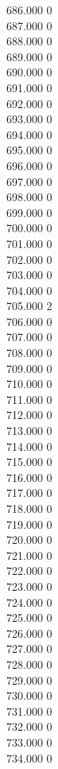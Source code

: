 { 686.000	0 \\
 687.000	0 \\
 688.000	0 \\
 689.000	0 \\
 690.000	0 \\
 691.000	0 \\
 692.000	0 \\
 693.000	0 \\
 694.000	0 \\
 695.000	0 \\
 696.000	0 \\
 697.000	0 \\
 698.000	0 \\
 699.000	0 \\
 700.000	0 \\
 701.000	0 \\
 702.000	0 \\
 703.000	0 \\
 704.000	0 \\
 705.000	2 \\
 706.000	0 \\
 707.000	0 \\
 708.000	0 \\
 709.000	0 \\
 710.000	0 \\
 711.000	0 \\
 712.000	0 \\
 713.000	0 \\
 714.000	0 \\
 715.000	0 \\
 716.000	0 \\
 717.000	0 \\
 718.000	0 \\
 719.000	0 \\
 720.000	0 \\
 721.000	0 \\
 722.000	0 \\
 723.000	0 \\
 724.000	0 \\
 725.000	0 \\
 726.000	0 \\
 727.000	0 \\
 728.000	0 \\
 729.000	0 \\
 730.000	0 \\
 731.000	0 \\
 732.000	0 \\
 733.000	0 \\
 734.000	0 \\
}
